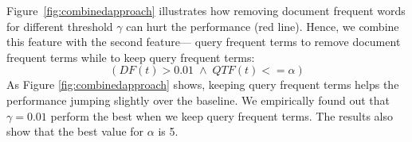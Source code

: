 Figure~\ref{fig:combinedapproach} illustrates how removing document frequent words for different threshold $\gamma$ can hurt the performance (red line). Hence, we combine this feature with the second feature--- query frequent terms to remove document frequent terms while to keep query frequent terms:
\begin{displaymath}( DF(t)>0.01 \; \wedge \; QTF(t)<=\alpha )\end{displaymath}
As Figure \ref{fig:combinedapproach} shows, keeping query frequent terms helps the performance jumping slightly over the baseline. We empirically found out that $\gamma=0.01$ perform the best when we keep query frequent terms. The results also show that the best value for $\alpha$ is 5.

